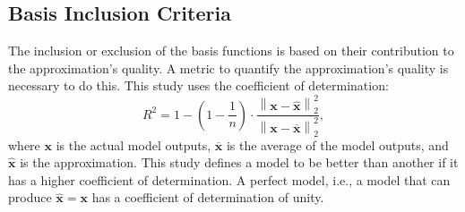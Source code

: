 %
%

\subsection{Basis Inclusion Criteria}
\label{ssec: inclusion criteria}

The inclusion or exclusion of the basis functions is based on their contribution to the approximation's quality.
A metric to quantify the approximation's quality is necessary to do this.
{This study uses the coefficient of determination:}%
\begin{equation}
    R^{2}
    =
    1 -
    \left(1-\frac{1}{n}\right)
    \cdot
    \frac{
        \left\|\mathbf{x}-\hat{\mathbf{x}}\right\|_{2}^{2}
    }{
        \left\|\mathbf{x}-\overline{\mathbf{x}}\right\|_{2}^{2}
    },
\end{equation}
where $\mathbf{x}$ is the actual model outputs, $\overline{\mathbf{x}}$ is the average of the model outputs, and $\hat{\mathbf{x}}$ is the approximation.
This study defines a model to be better than another if it has a higher coefficient of determination.
A perfect model, i.e., a model that can produce $\hat{\mathbf{x}}=\mathbf{x}$ has a coefficient of determination of unity.